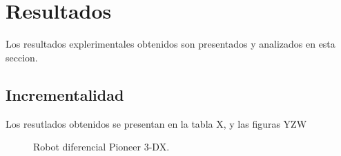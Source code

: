 \section{Resultados}
Los resultados explerimentales obtenidos son presentados y analizados en esta
seccion.
\subsection{Incrementalidad}\label{sec:exp:inc}
Los resutlados obtenidos se presentan en la tabla X, y las figuras YZW





\begin{figure}[H]
  \centerfloat


  \qquad

  \caption[Robot diferencial Pioneer 3-DX.]{Robot diferencial Pioneer 3-DX.}\label{fig:gra:inc1}

\end{figure}


